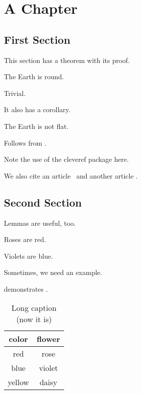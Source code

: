 \chapter{A Chapter}\label{chap_first}

\section{First Section}
This section has a theorem with its proof. 

\begin{theorem}\label{thm:earth}
    The Earth is round.
\end{theorem}

\begin{IEEEproof}
    Trivial.
\end{IEEEproof}

It also has a corollary.

\begin{corollary}
    The Earth is not flat.
\end{corollary}

\begin{IEEEproof}
    Follows from .
\end{IEEEproof}
Note the use of the cleveref package here. 

We also cite an article~\cite{Blackwell1951} and another article \cite{knuth_notation}. 

\section{Second Section}
Lemmas are useful, too. 

\begin{lemma}\label{lem:roses}
    Roses are red. 
\end{lemma}

\begin{IEEEproof}
    Violets are blue.
\end{IEEEproof}

Sometimes, we need an example.

\begin{example}
     demonstrates . 
	\begin{table}[t]
			\centering
            \caption[Short caption]{Long caption (now it is)} \label{tab:roses}
	\begin{tabular}{cc}
        \toprule  color & flower \\  \midrule
        red    & rose \\ 
        blue   & violet \\
        yellow & daisy \\  \bottomrule
	\end{tabular} 	
	\end{table}		
\end{example}    

